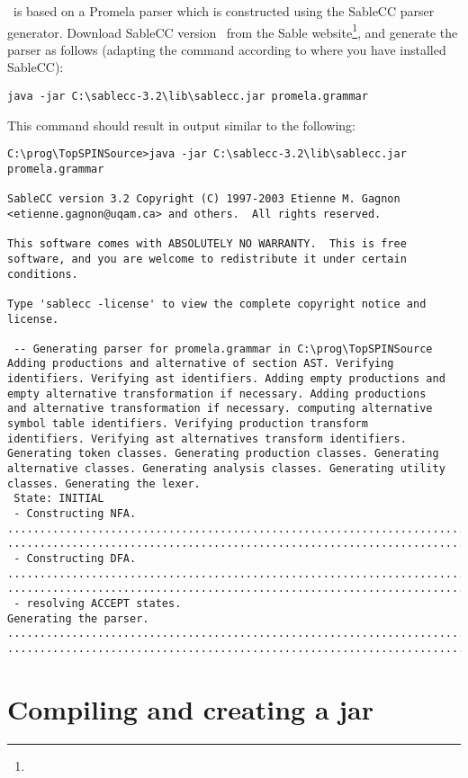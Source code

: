 \topspin\ is based on a Promela parser which is constructed using
the SableCC parser generator.  Download SableCC version
\sableccversion\ from the Sable
website\footnote{\texttt{\sableccwebsite}}, and generate the parser
as follows (adapting the command according to where you have
installed SableCC):
%
\begin{lstlisting}
java -jar C:\sablecc-3.2\lib\sablecc.jar promela.grammar
\end{lstlisting}
%
This command should result in output similar to the following:
%
\begin{lstlisting}
C:\prog\TopSPINSource>java -jar C:\sablecc-3.2\lib\sablecc.jar
promela.grammar

SableCC version 3.2 Copyright (C) 1997-2003 Etienne M. Gagnon
<etienne.gagnon@uqam.ca> and others.  All rights reserved.

This software comes with ABSOLUTELY NO WARRANTY.  This is free
software, and you are welcome to redistribute it under certain
conditions.

Type 'sablecc -license' to view the complete copyright notice and
license.

 -- Generating parser for promela.grammar in C:\prog\TopSPINSource
Adding productions and alternative of section AST. Verifying
identifiers. Verifying ast identifiers. Adding empty productions and
empty alternative transformation if necessary. Adding productions
and alternative transformation if necessary. computing alternative
symbol table identifiers. Verifying production transform
identifiers. Verifying ast alternatives transform identifiers.
Generating token classes. Generating production classes. Generating
alternative classes. Generating analysis classes. Generating utility
classes. Generating the lexer.
 State: INITIAL
 - Constructing NFA.
..............................................................................
..............................................................................
 - Constructing DFA.
..............................................................................
..............................................................................
 - resolving ACCEPT states.
Generating the parser.
..............................................................................
..............................................................................
\end{lstlisting}

\section{Compiling and creating a jar}\label{sec:compilingfromsource:compiling}

